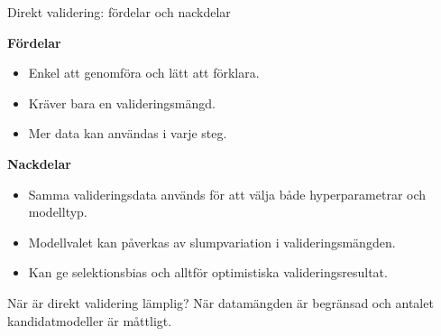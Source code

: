\documentclass[10pt,english]{beamer}
\begin{document}
\begin{frame}{Direkt validering: fördelar och nackdelar}

\textbf{Fördelar}
\begin{itemize}
    \item Enkel att genomföra och lätt att förklara.
    \item Kräver bara en valideringsmängd.
    \item Mer data kan användas i varje steg.
\end{itemize}

\vspace{0.2cm}

\textbf{Nackdelar}
\begin{itemize}
    \item Samma valideringsdata används för att välja både
          hyperparametrar och modelltyp.
    \item Modellvalet kan påverkas av slumpvariation i
          valideringsmängden.
    \item Kan ge selektionsbias och alltför optimistiska
          valideringsresultat.
\end{itemize}

\vspace{0.2cm}

\begin{block}{När är direkt validering lämplig?}
När datamängden är begränsad och antalet kandidatmodeller är måttligt.
\end{block}

\end{frame}
\end{document}
